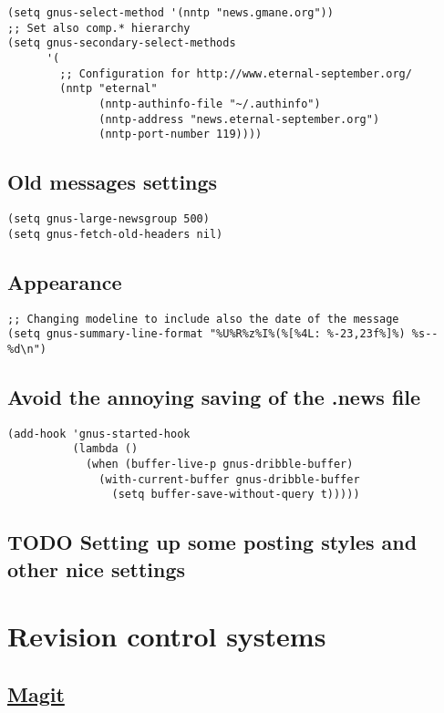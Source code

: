 \documentclass[11pt]{article}
\begin{document}
\begin{verbatim}
(setq gnus-select-method '(nntp "news.gmane.org"))
;; Set also comp.* hierarchy
(setq gnus-secondary-select-methods
      '(
        ;; Configuration for http://www.eternal-september.org/
        (nntp "eternal"
              (nntp-authinfo-file "~/.authinfo")
              (nntp-address "news.eternal-september.org")
              (nntp-port-number 119))))
\end{verbatim}
\subsection{Old messages settings}
\label{sec-35.2}

\begin{verbatim}
(setq gnus-large-newsgroup 500)
(setq gnus-fetch-old-headers nil)
\end{verbatim}
\subsection{Appearance}
\label{sec-35.3}

\begin{verbatim}
;; Changing modeline to include also the date of the message
(setq gnus-summary-line-format "%U%R%z%I%(%[%4L: %-23,23f%]%) %s--%d\n")
\end{verbatim}
\subsection{Avoid the annoying saving of the .news file}
\label{sec-35.4}

\begin{verbatim}
(add-hook 'gnus-started-hook
          (lambda ()
            (when (buffer-live-p gnus-dribble-buffer)
              (with-current-buffer gnus-dribble-buffer
                (setq buffer-save-without-query t)))))
\end{verbatim}
\subsection{\textbf{TODO} Setting up some posting styles and other nice settings}
\label{sec-35.5}
\section{Revision control systems}
\label{sec-36}
\subsection{\href{http://zagadka.vm.bytemark.co.uk/magit/}{Magit}}
\label{sec-36.1}
\end{document}
